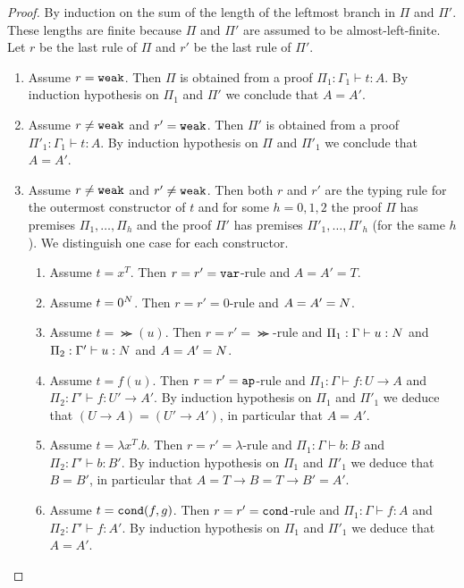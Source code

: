 \begin{proof}
By induction on the sum of the length of the leftmost branch in $\Pi$ and $\Pi'$. These lengths are finite
because $\Pi$ and $\Pi'$ are assumed to be almost-left-finite. Let $r$ be the last rule of $\Pi$ and $r'$ be the
last rule of $\Pi'$.
\begin{enumerate}
\item
Assume $r = {\tt weak}$. Then $\Pi$ is obtained from a proof $\Pi_1:\Gamma_1 \vdash t:A$. 
By induction hypothesis on $\Pi_1$ and $\Pi'$ we conclude that $A = A'$.

\item
Assume $r \not = {\tt weak}$ and $r' = {\tt weak}$. 
Then $\Pi'$ is obtained from a proof $\Pi'_1:\Gamma_1 \vdash t:A$. 
By induction hypothesis on $\Pi$ and $\Pi'_1$ we conclude that $A = A'$.

\item
Assume  $r \not = {\tt weak}$ and $r' \not = {\tt weak}$. Then both $r$ and $r'$ are the typing rule for
the outermost constructor of $t$ and for some
$h=0,1,2$ the proof $\Pi$ has premises $\Pi_1, \ldots, \Pi_h$
and the proof $\Pi'$ has premises $\Pi'_1, \ldots, \Pi'_h$ (for the same $h$). 
We distinguish one case for each constructor.

\begin{enumerate}
\item
Assume $t = x^T$. Then $r=r'={\tt var}$-rule and $A = A' = T$.

\item
Assume $t =0^{N}$. Then $r=r'=0$-rule and $A = A' = {N}$.

\item
Assume $t =\Succ(u)$. Then $r=r'=\Succ$-rule  and $\Pi_1:\Gamma \vdash u: {N}$
and $\Pi_2:\Gamma' \vdash u:{N}$ and $A = A' = {N}$.

\item
Assume $t = f(u)$. Then $r=r'={\tt ap}$-rule and $\Pi_1:\Gamma \vdash f:U \rightarrow A$
and $\Pi_2:\Gamma' \vdash f:U' \rightarrow A'$. By induction hypothesis on $\Pi_1$ and
$\Pi'_1$ we deduce that $(U \rightarrow A) = (U' \rightarrow A')$, in particular that $A = A'$.

\item
Assume $t = \lambda x^T.b$. Then $r=r'=\lambda$-rule and 
$\Pi_1:\Gamma \vdash b:B$
and $\Pi_2:\Gamma' \vdash b:B'$. By induction hypothesis on $\Pi_1$ and
$\Pi'_1$ we deduce that $B=B'$, in particular that $A = T \rightarrow B = T \rightarrow B' = A'$.

\item
Assume $t = {\tt cond}(f,g)$. Then $r=r'={\tt cond}$-rule and $\Pi_1:\Gamma \vdash f:A$
and $\Pi_2:\Gamma' \vdash f:A'$. By induction hypothesis on $\Pi_1$ and
$\Pi'_1$ we deduce that $A = A'$.

\end{enumerate}
\end{enumerate}
\end{proof}


